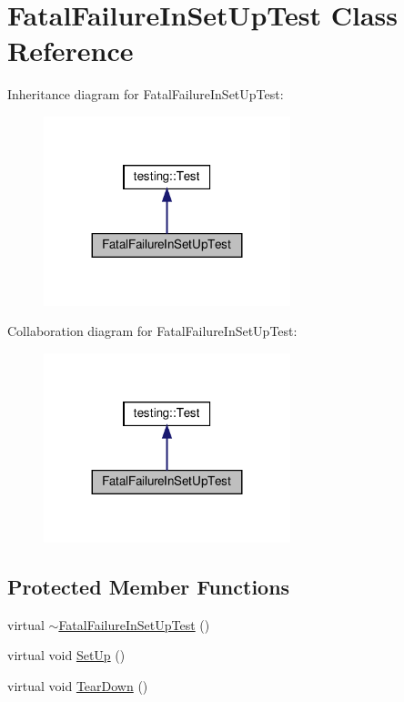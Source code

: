 \hypertarget{class_fatal_failure_in_set_up_test}{}\section{Fatal\+Failure\+In\+Set\+Up\+Test Class Reference}
\label{class_fatal_failure_in_set_up_test}


Inheritance diagram for Fatal\+Failure\+In\+Set\+Up\+Test\+:
\nopagebreak
\begin{figure}[H]
\begin{center}
\leavevmode
\includegraphics[width=203pt]{class_fatal_failure_in_set_up_test__inherit__graph}
\end{center}
\end{figure}


Collaboration diagram for Fatal\+Failure\+In\+Set\+Up\+Test\+:
\nopagebreak
\begin{figure}[H]
\begin{center}
\leavevmode
\includegraphics[width=203pt]{class_fatal_failure_in_set_up_test__coll__graph}
\end{center}
\end{figure}
\subsection*{Protected Member Functions}
\begin{DoxyCompactItemize}
\item 
virtual \hyperlink{class_fatal_failure_in_set_up_test_a915ca362b046259c3586c1ab72bb0a93}{$\sim$\+Fatal\+Failure\+In\+Set\+Up\+Test} ()
\item 
virtual void \hyperlink{class_fatal_failure_in_set_up_test_a455696f86fb5f5393624221ccb79b373}{Set\+Up} ()
\item 
virtual void \hyperlink{class_fatal_failure_in_set_up_test_a457707161063e08f7b6600ec5db449e4}{Tear\+Down} ()
\end{DoxyCompactItemize}
